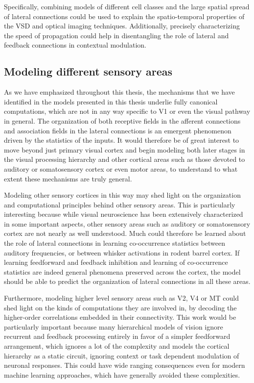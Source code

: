 Specifically, combining models of different cell classes and the large
spatial spread of lateral connections could be used to explain the
spatio-temporal properties of the VSD and optical imaging
techniques. Additionally, precisely characterizing the speed of
propagation could help in disentangling the role of lateral and
feedback connections in contextual modulation.

\subsection{Modeling different sensory areas}

As we have emphasized throughout this thesis, the mechanisms that we
have identified in the models presented in this thesis underlie
fully canonical computations, which are not in any way specific to V1 or
even the visual pathway in general. The organization of both receptive
fields in the afferent connections and association fields in the
lateral connections is an emergent phenomenon driven by the statistics
of the inputs. It would therefore be of great interest to move beyond
just primary visual cortex and begin modeling both later stages in the
visual processing hierarchy and other cortical areas such as those
devoted to auditory or somatosensory cortex or even motor areas, to
understand to what extent these mechanisms are truly general.

Modeling other sensory cortices in this way may shed light on the
organization and computational principles behind other sensory
areas. This is particularly interesting because while visual
neuroscience has been extensively characterized in some important
aspects, other sensory areas
such as auditory or somatosensory cortex are not nearly as well
understood. Much could therefore be learned about the role of
lateral connections in learning co-occurrence statistics between
auditory frequencies, or between whisker activations in rodent barrel
cortex. If learning feedforward and feedback inhibition and learning
of co-occurrence statistics are indeed general phenomena preserved
across the cortex, the model should be able to predict the organization
of lateral connections in all these areas.

Furthermore, modeling higher level sensory areas such as V2, V4 or MT
could shed light on the kinds of computations they are involved in, by
decoding the higher-order correlations embedded in their
connectivity. This work would be particularly important because many
hierarchical models of vision ignore recurrent and feedback processing
entirely in favor of a simpler feedforward arrangement, which ignores
a lot of the complexity and models the cortical hierarchy as a static
circuit, ignoring context or task dependent modulation of neuronal
responses. This could have wide ranging consequences even for modern
machine learning approaches, which have generally avoided these
complexities.


